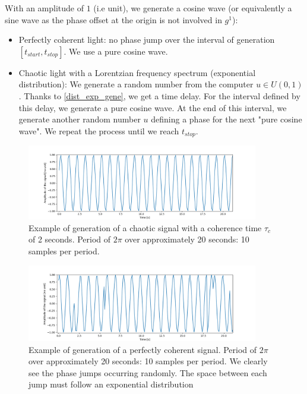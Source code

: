 \documentclass[11pt]{report}
\begin{document}
With an amplitude of $1$ (i.e unit), we generate a cosine wave (or equivalently a sine wave as the phase offset at the origin is not involved in $g^1$):
\begin{itemize}
	\item Perfectly coherent light: no phase jump over the interval of generation $\left[ t_{start}, t_{stop} \right]$. We use a pure cosine wave.
	\item Chaotic light with a Lorentzian frequency spectrum (exponential distribution): We generate a random number from the computer $u \in U(0,1)$. Thanks to \eqref{dist_exp_gene}, we get a time delay. For the interval defined by this delay, we generate a pure cosine wave. At the end of this interval, we generate another random number $u$ defining a phase for the next "pure cosine wave". We repeat the process until we reach $t_{stop}$.
\end{itemize}

\begin{figure}[h!]
\centering
\includegraphics[width=0.9\textwidth]{coh_gen}
\caption{Example of generation of a chaotic signal with a coherence time $\tau_c$ of 2 seconds. Period of $2\pi$ over approximately 20 seconds: 10 samples per period.}
\end{figure}

\begin{figure}[h!]
\centering
\includegraphics[width=0.9\textwidth]{chaos_gen}
\caption{Example of generation of a perfectly coherent signal. Period of $2\pi$ over approximately 20 seconds: 10 samples per period. We clearly see the phase jumps occurring randomly. The space between each jump must follow an exponential distribution}
\end{figure}
\end{document}
